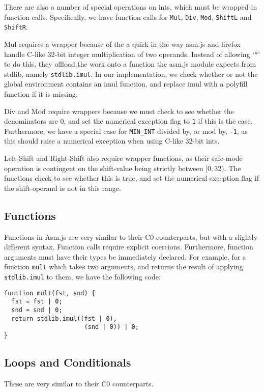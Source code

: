 \documentclass[twoside]{article}
\begin{document}
\begin{multicols}{2}
    There are also a number of special operations on ints, which must be
    wrapped in function calls. Specifically, we have function calls for \texttt{Mul},
    \texttt{Div}, \texttt{Mod}, \texttt{ShiftL} and \texttt{ShiftR}. 
    
    Mul requires a 
    wrapper because of the a quirk in the way asm.js and firefox handle C-like 32-bit integer 
    multiplication of two operands. Instead of allowing `*' to do this, they offload the work
    onto a function the asm.js module expects from stdlib, namely \texttt{stdlib.imul}. In 
    our implementation, we check whether or not the global environment contains an imul function,
    and replace imul with a polyfill function if it is missing. 

    Div and Mod require wrappers because we must check to see whether the denominators are 0,
    and set the numerical exception flag to \texttt{1} if this is the case. Furthermore, we have
    a special case for \texttt{MIN\_INT} divided by, or mod by, \texttt{-1}, as this should raise
    a numerical exception when using C-like 32-bit ints. 

    Left-Shift and Right-Shift also require wrapper functions, as their safe-mode operation
    is contingent on the shift-value being strictly between $[0,32)$. The functions check
    to see whether this is true, and set the numerical exception flag if the shift-operand is
    not in this range. 
  \subsection{Functions}
    Functions in Asm.js are very similar to their C0 counterparts, but with a
    slightly different syntax. Function calls require explicit coercions. Furthermore,
    function arguments must have their types be immediately declared. For example, for
    a function \texttt{mult} which takes two arguments, and returns the result of applying
    \texttt{stdlib.imul} to them, we have the following code: 
\begin{verbatim}
function mult(fst, snd) {
  fst = fst | 0;
  snd = snd | 0;
  return stdlib.imul((fst | 0), 
                      (snd | 0)) | 0;
}
\end{verbatim}

  \subsection{Loops and Conditionals}
    These are very similar to their C0 counterparts.


\end{multicols}
\end{document}
